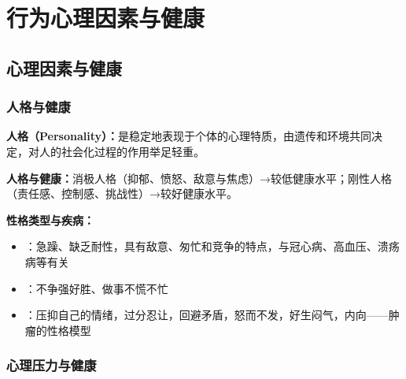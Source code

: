 \chapter{行为心理因素与健康}
\setcounter{chapter}{7}

\section{心理因素与健康}

\subsection{人格与健康}

\begin{defbox}
\textbf{人格（Personality）：}是稳定地表现于个体的心理特质，由遗传和环境共同决定，对人的社会化过程的作用举足轻重。

\textbf{人格与健康：}消极人格（抑郁、愤怒、敌意与焦虑）→较低健康水平；刚性人格（责任感、控制感、挑战性）→较好健康水平。

\textbf{性格类型与疾病：}
\begin{itemize}[leftmargin=*]
    \item {}：急躁、缺乏耐性，具有敌意、匆忙和竞争的特点，与冠心病、高血压、溃疡病等有关
    \item {}：不争强好胜、做事不慌不忙
    \item {}：压抑自己的情绪，过分忍让，回避矛盾，怒而不发，好生闷气，内向——肿瘤的性格模型
\end{itemize}
\end{defbox}

\subsection{心理压力与健康}


